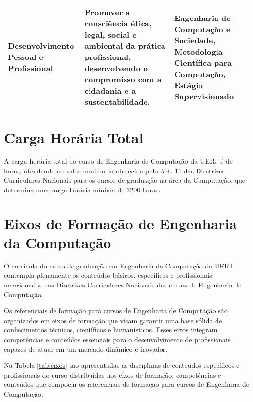 \begin{table}[ht]
\begin{tabularx}{\textwidth}{>{\bfseries}l X X}
    Desenvolvimento Pessoal e Profissional                                                                                                             &
    Promover a consciência ética, legal, social e ambiental da prática profissional, desenvolvendo o compromisso com a cidadania e a sustentabilidade. &
    Engenharia de Computação e Sociedade, Metodologia Científica para Computação, Estágio Supervisionado                                                                                                         \\
    \bottomrule
  \end{tabularx}
\end{table}

\section{Carga Horária Total}

A carga horária total do curso de Engenharia de Computação da UERJ é de \tHorasCurso horas, atendendo ao valor mínimo estabelecido pelo Art. 11 das Diretrizes Curriculares Nacionais para os cursos de graduação na área da Computação, que determina uma carga horária mínima de 3200 horas.


\section{Eixos de Formação de Engenharia da Computação}

O currículo do curso de graduação em Engenharia da Computação da UERJ contempla plenamente os conteúdos básicos, específicos e profissionais mencionados nas Diretrizes Curriculares Nacionais dos cursos de Engenharia de Computação.

Os referenciais de formação para cursos de Engenharia de Computação são organizados em eixos de formação que visam garantir uma base sólida de conhecimentos técnicos, científicos e humanísticos. Esses eixos integram competências e conteúdos essenciais para o desenvolvimento de profissionais capazes de atuar em um mercado dinâmico e inovador.

Na Tabela \ref{tab:eixos} são apresentadas as disciplinas de conteúdos específicos e profissionais do curso distribuídas nos eixos de formação, competências e conteúdos que compõem os referenciais de formação para cursos de Engenharia de Computação.



